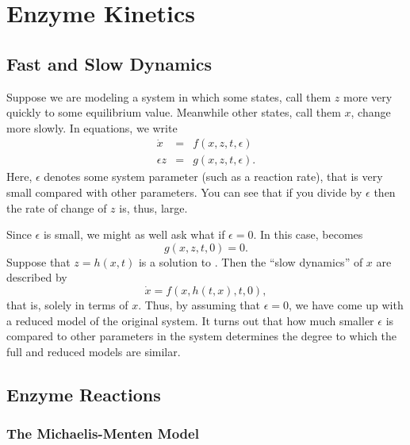 \chapter{Enzyme Kinetics} \label{ch:enzyme}

\section{Fast and Slow Dynamics}

Suppose we are modeling a system in which some states, call them $z$
more very quickly to some equilibrium value. Meanwhile other states,
call them $x$, change more slowly. In equations, we write
%
\begin{eqnarray}
\dot x & = & f ( x, z, t, \epsilon ) \label{eqn:fast-slow1} \\
\epsilon z & = & g ( x, z, t, \epsilon ). \label{eqn:fast-slow2}
\end{eqnarray}
%
Here, $\epsilon$ denotes some system parameter (such as a reaction
rate), that is very small compared with other parameters. You can see
that if you divide  by $\epsilon$ then the rate
of change of $z$ is, thus, large. 

Since $\epsilon$ is small, we might as well ask what if
$\epsilon=0$. In this case,  becomes
%
\begin{equation} \label{eqn:fast-slow-eqality}
g ( x, z, t, 0 ) = 0. 
\end{equation}
%
Suppose that $z=h(x,t)$ is a solution to
. Then the ``slow dynamics'' of $x$ are
described by
%
\begin{equation} \label{eqn:fast-slow-reduced}
\dot x = f ( x, h(t,x), t, 0 ), 
\end{equation}
%
that is, solely in terms of $x$. Thus, by assuming that $\epsilon=0$,
we have come up with a reduced model of the original system. It turns
out that how much smaller $\epsilon$ is compared to other parameters
in the system determines the degree to which the full and reduced
models are similar.

\section{Enzyme Reactions}

\subsection{The Michaelis-Menten Model}


